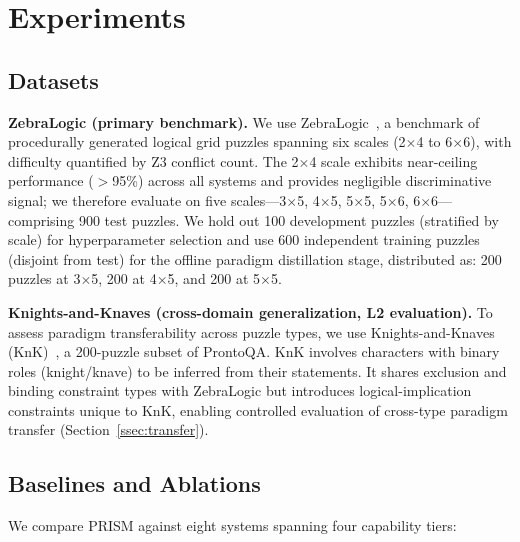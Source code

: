 
\section{Experiments}
\label{sec:experiments}

\subsection{Datasets}

\textbf{ZebraLogic (primary benchmark).} We use ZebraLogic~\citep{Lin2025}, a benchmark of procedurally generated logical grid puzzles spanning six scales (2$\times$4 to 6$\times$6), with difficulty quantified by Z3 conflict count. The 2$\times$4 scale exhibits near-ceiling performance ($>$95\%) across all systems and provides negligible discriminative signal; we therefore evaluate on five scales—3$\times$5, 4$\times$5, 5$\times$5, 5$\times$6, 6$\times$6—comprising 900 test puzzles. We hold out 100 development puzzles (stratified by scale) for hyperparameter selection and use 600 independent training puzzles (disjoint from test) for the offline paradigm distillation stage, distributed as: 200 puzzles at 3$\times$5, 200 at 4$\times$5, and 200 at 5$\times$5.

\textbf{Knights-and-Knaves (cross-domain generalization, L2 evaluation).} To assess paradigm transferability across puzzle types, we use Knights-and-Knaves (KnK)~\citep{Saparov2022}, a 200-puzzle subset of ProntoQA. KnK involves characters with binary roles (knight/knave) to be inferred from their statements. It shares exclusion and binding constraint types with ZebraLogic but introduces logical-implication constraints unique to KnK, enabling controlled evaluation of cross-type paradigm transfer (Section~\ref{ssec:transfer}).

\subsection{Baselines and Ablations}
\label{sec:results}

We compare PRISM against eight systems spanning four capability tiers:

